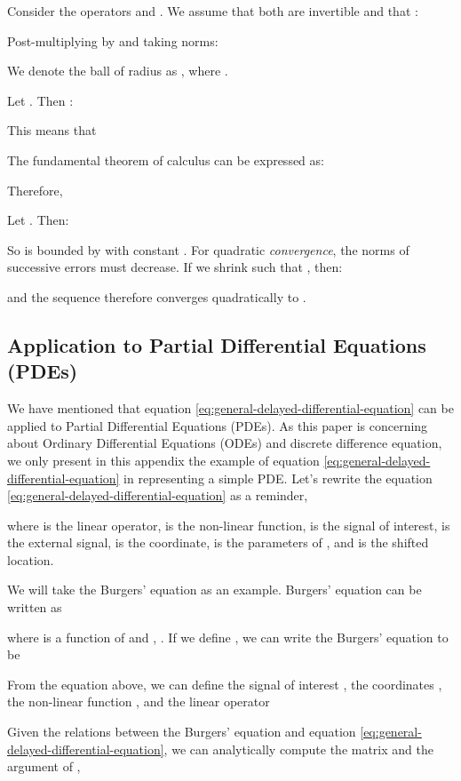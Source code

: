 Consider the operators  and . We assume that both are invertible and that :


Post-multiplying by  and taking norms:

We denote the ball of radius  as , where . 

Let . Then : 

This means that

The fundamental theorem of calculus can be expressed as:

Therefore,

Let . Then:

So  is bounded by  with constant . For quadratic \textit{convergence}, the norms of successive errors must decrease. If we shrink  such that , then:

and the sequence therefore converges quadratically to . \hfill 



\subsection{Application to Partial Differential Equations (PDEs)}
\label{appsubsec:pde-example}

We have mentioned that equation \ref{eq:general-delayed-differential-equation} can be applied to Partial Differential Equations (PDEs).
As this paper is concerning about Ordinary Differential Equations (ODEs) and discrete difference equation, we only present in this appendix the example of equation \ref{eq:general-delayed-differential-equation} in representing a simple PDE.
Let's rewrite the equation \ref{eq:general-delayed-differential-equation} as a reminder,

where  is the linear operator,  is the non-linear function,  is the signal of interest,  is the external signal,  is the coordinate,  is the parameters of , and  is the shifted location.

We will take the Burgers' equation as an example.
Burgers' equation can be written as

where  is a function of  and , .
If we define , we can write the Burgers' equation to be

From the equation above, we can define the signal of interest , the coordinates , the non-linear function , and the linear operator


Given the relations between the Burgers' equation and equation \ref{eq:general-delayed-differential-equation}, we can analytically compute the  matrix and the argument of ,

